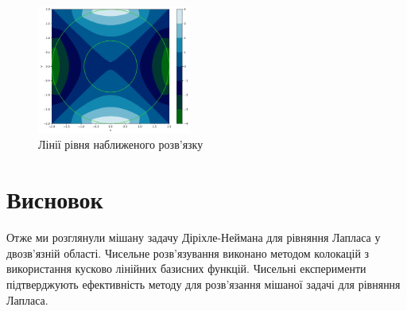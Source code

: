 \documentclass[14pt,a4paper]{extarticle}
\newcounter{e}
\numberwithin{equation}{section}
\numberwithin{figure}{section}
\begin{document}
\begin{figure}[!htb]
	\centering
	\includegraphics[width=0.45\textwidth]{resources/ex2_contourf.pdf}
	\caption{Лінії рівня наближеного розв'язку}
	\label{fig:ex2_contourf}
\end{figure}

  \newpage
 \thispagestyle{empty}
  \section{Висновок}
	Отже ми розглянули мішану задачу Діріхле-Неймана для рівняння Лапласа у двозв’язній області. Чисельне розв’язування виконано методом колокацій з використання кусково лінійних базисних функцій. Чисельні експерименти підтверджують ефективність методу для розв’язання мішаної задачі для рівняння Лапласа.
	
  
  
 \newpage 

\nocite{kress2012linear}
\nocite{chapko2009altrating}
\nocite{chapko2009numerical}
\nocite{atkinson2009}

\printbibliography[title={Бібліографія}]
\end{document}
